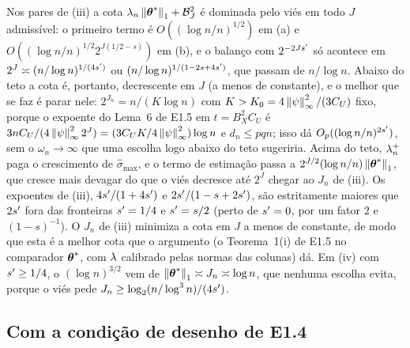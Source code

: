 \documentclass[11pt,a4paper]{article}
\newcommand{\smax}{\widehat{\sigma}_{\max}}
\begin{document}
\begin{remark}\label{rem:teto}
Nos pares de (iii) a cota $\lambda_{n}\left\lVert \boldsymbol{\theta}^{*} \right\rVert_{1} +
\mathcal{B}_{J}^{2}$ é dominada pelo viés em todo $J$ admissível: o primeiro
termo é $O((\log n/n)^{1/2})$ em (a) e
$O((\log n/n)^{1/2}2^{J(1/2-s)})$ em (b), e o balanço com
$2^{-2Js'}$ só acontece em $2^{J} \asymp (n/\log n)^{1/(4s')}$ ou
$(n/\log n)^{1/(1-2s+4s')}$, que passam de $n/\log n$. Abaixo do teto a
cota é, portanto, decrescente em $J$ (a menos de constante), e o melhor que
se faz é parar nele: $2^{J_{n}} = n/(K\log n)$ com $K > K_{0} =
4\left\lVert \psi \right\rVert_{\infty}^{2}/(3C_{U})$ fixo, porque o expoente do Lema~6 de E1.5
em $t = B_{X}^{2}C_{U}$ é $3nC_{U}/(4\left\lVert \psi \right\rVert_{\infty}^{2}2^{J}) =
(3C_{U}K/4\left\lVert \psi \right\rVert_{\infty}^{2})\log n$ e $d_{n} \le pqn$; isso dá
$O_{p}((\log n/n)^{2s'})$, sem o $\omega_{n} \to \infty$ que uma
escolha logo abaixo do teto sugeriria. Acima do teto, $\lambda_{n}^{+}$ paga o
crescimento de $\smax$, e o termo de estimação passa a
$2^{J/2}(\log n/n)\left\lVert \boldsymbol{\theta}^{*} \right\rVert_{1}$, que cresce mais devagar do que o
viés decresce até $2^{J}$ chegar ao $J_{n}$ de (iii). Os expoentes de (iii),
$4s'/(1+4s')$ e $2s'/(1-s+2s')$, são estritamente maiores que
$2s'$ fora das fronteiras $s' = 1/4$ e $s' = s/2$ (perto de
$s' = 0$, por um fator $2$ e $(1-s)^{-1}$). O $J_{n}$ de (iii) minimiza
a cota em $J$ a menos de constante, de modo que esta é a melhor cota que o
argumento (o Teorema~1(i) de E1.5 no comparador $\boldsymbol{\theta}^{*}$, com $\lambda$
calibrado pelas normas das colunas) dá. Em (iv) com $s' \ge 1/4$, o
$(\log n)^{3/2}$ vem de $\left\lVert \boldsymbol{\theta}^{*} \right\rVert_{1} \asymp J_{n} \asymp \log n$,
que nenhuma escolha evita, porque o viés pede $J_{n} \ge
\log_{2}(n/\log^{3}n)/(4s')$.
\end{remark}

\subsection*{Com a condição de desenho de E1.4}
\end{document}
